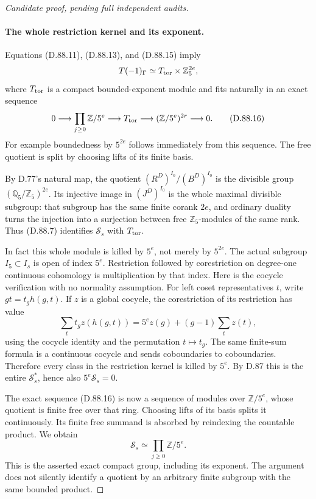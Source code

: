 \begin{proof}[Candidate proof, pending full independent audits]
\paragraph{The whole restriction kernel and its exponent.}
Equations (D.88.11), (D.88.13), and (D.88.15) imply
\[
 T(-1)_\Gamma\simeq T_{\rm tor}\times\mathbb Z_5^{2e},
\]
where \(T_{\rm tor}\) is a compact bounded-exponent module
and fits naturally in an exact sequence
\[
 0\longrightarrow\prod_{j\ge0}\mathbb Z/5^e
    \longrightarrow T_{\rm tor}
    \longrightarrow(\mathbb Z/5^e)^{2r}\longrightarrow0.
                                                               \tag{D.88.16}
\]
For example boundedness by \(5^{2e}\) follows immediately
from this sequence. The free quotient is split by choosing
lifts of its finite basis.

By D.77's natural map, the quotient
\((R^D)^{I_0}/(B^D)^{I_0}\) is the divisible group
\((\mathbb Q_5/\mathbb Z_5)^{2e}\). Its injective image
in \((J^D)^{I_0}\) is the whole maximal divisible subgroup:
that subgroup has the same finite corank \(2e\), and
ordinary duality turns the injection into a surjection between
free \(\mathbb Z_5\)-modules of the same rank. Thus
(D.88.7) identifies \(\mathcal S_s\) with \(T_{\rm tor}\).

In fact this whole module is killed by \(5^e\), not merely
by \(5^{2e}\). The actual subgroup \(I_5\subset I_s\)
is open of index \(5^e\). Restriction followed by
corestriction on degree-one continuous cohomology is
multiplication by that index. Here is the cocycle verification
with no normality assumption. For left coset representatives
\(t\), write \(gt=t_g h(g,t)\). If \(z\) is a global
cocycle, the corestriction of its restriction has value
\[
 \sum_t t_g z(h(g,t))
   =5^e z(g)+(g-1)\sum_t z(t),
                                                               \tag{D.88.17}
\]
using the cocycle identity and the permutation \(t\mapsto t_g\).
The same finite-sum formula is a continuous cocycle and sends
coboundaries to coboundaries. Therefore every class in the
restriction kernel is killed by \(5^e\). By D.87 this is
the entire \(\mathcal S_s^*\), hence also
\(5^e\mathcal S_s=0\).

The exact sequence (D.88.16) is now a sequence of modules over
\(\mathbb Z/5^e\), whose quotient is finite free over that
ring. Choosing lifts of its basis splits it continuously.
Its finite free summand is absorbed by reindexing the countable
product. We obtain
\[
                       \mathcal S_s\simeq
                            \prod_{j\ge0}\mathbb Z/5^e.
\]
This is the asserted exact compact group, including its exponent.
The argument does not silently identify a quotient by an
arbitrary finite subgroup with the same bounded product.


\end{proof}
